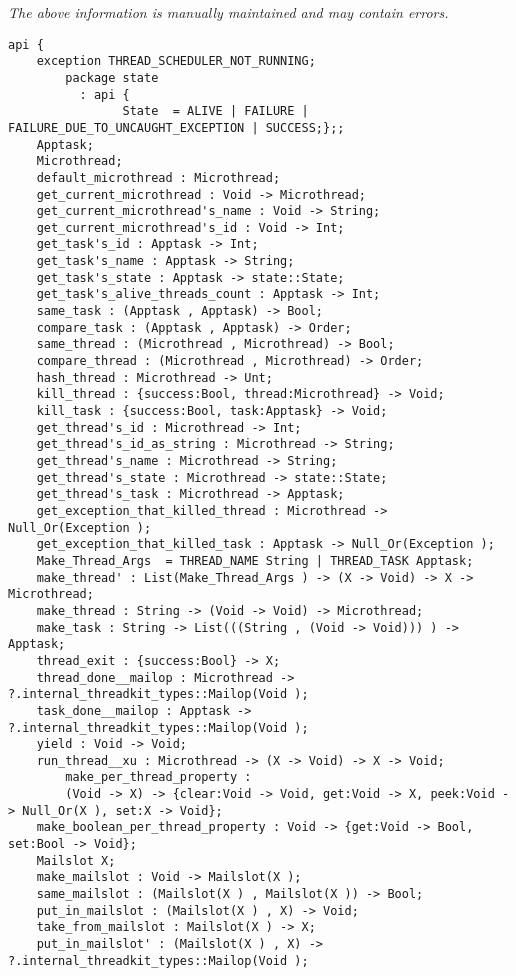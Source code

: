 \label{api:Threadkit}

{\tiny \it The above information is manually maintained and may contain errors.}
\begin{verbatim}
api {
    exception THREAD_SCHEDULER_NOT_RUNNING;
        package state
          : api {
                State  = ALIVE | FAILURE | FAILURE_DUE_TO_UNCAUGHT_EXCEPTION | SUCCESS;};;
    Apptask;
    Microthread;
    default_microthread : Microthread;
    get_current_microthread : Void -> Microthread;
    get_current_microthread's_name : Void -> String;
    get_current_microthread's_id : Void -> Int;
    get_task's_id : Apptask -> Int;
    get_task's_name : Apptask -> String;
    get_task's_state : Apptask -> state::State;
    get_task's_alive_threads_count : Apptask -> Int;
    same_task : (Apptask , Apptask) -> Bool;
    compare_task : (Apptask , Apptask) -> Order;
    same_thread : (Microthread , Microthread) -> Bool;
    compare_thread : (Microthread , Microthread) -> Order;
    hash_thread : Microthread -> Unt;
    kill_thread : {success:Bool, thread:Microthread} -> Void;
    kill_task : {success:Bool, task:Apptask} -> Void;
    get_thread's_id : Microthread -> Int;
    get_thread's_id_as_string : Microthread -> String;
    get_thread's_name : Microthread -> String;
    get_thread's_state : Microthread -> state::State;
    get_thread's_task : Microthread -> Apptask;
    get_exception_that_killed_thread : Microthread -> Null_Or(Exception );
    get_exception_that_killed_task : Apptask -> Null_Or(Exception );
    Make_Thread_Args  = THREAD_NAME String | THREAD_TASK Apptask;
    make_thread' : List(Make_Thread_Args ) -> (X -> Void) -> X -> Microthread;
    make_thread : String -> (Void -> Void) -> Microthread;
    make_task : String -> List(((String , (Void -> Void))) ) -> Apptask;
    thread_exit : {success:Bool} -> X;
    thread_done__mailop : Microthread -> ?.internal_threadkit_types::Mailop(Void );
    task_done__mailop : Apptask -> ?.internal_threadkit_types::Mailop(Void );
    yield : Void -> Void;
    run_thread__xu : Microthread -> (X -> Void) -> X -> Void;
        make_per_thread_property :
        (Void -> X) -> {clear:Void -> Void, get:Void -> X, peek:Void -> Null_Or(X ), set:X -> Void};
    make_boolean_per_thread_property : Void -> {get:Void -> Bool, set:Bool -> Void};
    Mailslot X;
    make_mailslot : Void -> Mailslot(X );
    same_mailslot : (Mailslot(X ) , Mailslot(X )) -> Bool;
    put_in_mailslot : (Mailslot(X ) , X) -> Void;
    take_from_mailslot : Mailslot(X ) -> X;
    put_in_mailslot' : (Mailslot(X ) , X) -> ?.internal_threadkit_types::Mailop(Void );

\end{verbatim}
